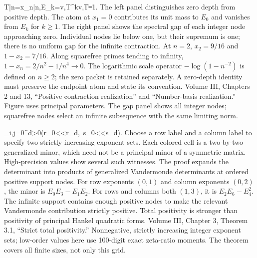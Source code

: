 {T|n\rangle=x_n|n\rangle,\qquad E_k=\langle v,T^kv\rangle,\qquad \|T\|=1.}
{The left panel distinguishes zero depth from positive depth. The atom at $x_1=0$ contributes its unit mass to $E_0$ and vanishes from $E_k$ for $k\ge1$. The right panel shows the spectral gap of each integer node approaching zero. Individual nodes lie below one, but their supremum is one; there is no uniform gap for the infinite contraction.}
{At $n=2$, $x_2=9/16$ and $1-x_2=7/16$. Along squarefree primes tending to infinity, $1-x_n=2/n^2-1/n^4\to0$. The logarithmic scale operator $-\log(1-n^{-2})$ is defined on $n\ge2$; the zero packet is retained separately.}
{A zero-depth identity must preserve the endpoint atom and state its convention.}
{Volume III, Chapters 2 and 13, ``Positive contraction realization'' and ``Number-basis realization.'' Figure uses principal parameters. The gap panel shows all integer nodes; squarefree nodes select an infinite subsequence with the same limiting norm.}

{\det[E_{r_i+s_j}]_{i,j=0}^{d}>0\qquad(r_0<\cdots<r_d,\ s_0<\cdots<s_d).}
{Choose a row label and a column label to specify two strictly increasing exponent sets. Each colored cell is a two-by-two generalized minor, which need not be a principal minor of a symmetric matrix. High-precision values show several such witnesses. The proof expands the determinant into products of generalized Vandermonde determinants at ordered positive support nodes.}
{For row exponents $(0,1)$ and column exponents $(0,2)$, the minor is $E_0E_3-E_1E_2$. For rows and columns both $(1,3)$, it is $E_2E_6-E_4^2$. The infinite support contains enough positive nodes to make the relevant Vandermonde contribution strictly positive.}
{Total positivity is stronger than positivity of principal Hankel quadratic forms.}
{Volume III, Chapter 3, Theorem 3.1, ``Strict total positivity.'' Nonnegative, strictly increasing integer exponent sets; low-order values here use 100-digit exact zeta-ratio moments. The theorem covers all finite sizes, not only this grid.}

